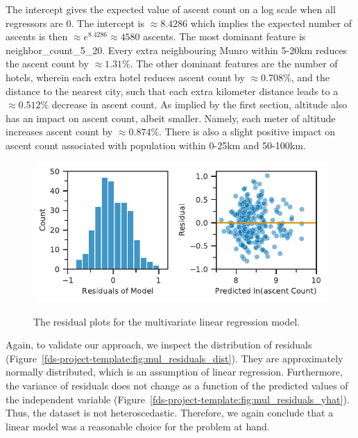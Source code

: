 \documentclass[11pt,a4paper]{article}
\begin{document}
The intercept gives the expected value of ascent count on a log scale when all regressors are 0. The intercept is $\approx8.4286$ which implies the expected number of ascents is then $\approx e^{8.4286} \approx 4580$ ascents. The most dominant feature is neighbor\_count\_5\_20. Every extra neighbouring Munro within 5-20km reduces the ascent count by $ \approx 1.31\%$. The other dominant features are the number of hotels, wherein each extra hotel reduces ascent count by $\approx 0.708\%$, and the distance to the nearest city, such that each extra kilometer distance leads to a $\approx 0.512\%$ decrease in ascent count. As implied by the first section, altitude also has an impact on ascent count, albeit smaller. Namely, each meter of altitude increases ascent count by $\approx 0.874\%$. There is also a slight positive impact on ascent count associated with population within 0-25km and 50-100km.
\begin{figure} [h!]
    \centering
    \includegraphics{report/multi_residuals_dist.pdf}
    \begin{minipage}[t]{.5\linewidth}
        \centering
        \label{fds-project-template:fig:mul_residuals_dist}
    \end{minipage}%
    \begin{minipage}[t]{.5\linewidth}
        \centering
        \label{fds-project-template:fig:mul_residuals_yhat}
    \end{minipage}
    \caption{The residual plots for the multivariate linear regression model.}
    \label{fds-project-template:fig:multi_residuals_dist}
\end{figure}

Again, to validate our approach, we inspect the distribution of residuals (Figure~\ref{fds-project-template:fig:mul_residuals_dist}). They are approximately  normally distributed, which is an assumption of linear regression. Furthermore, the variance of residuals does not change as a function of the predicted values of the independent variable (Figure~\ref{fds-project-template:fig:mul_residuals_yhat}). Thus, the dataset is not heteroscedastic. Therefore, we again conclude that a linear model was a reasonable choice for the problem at hand.
\end{document}
